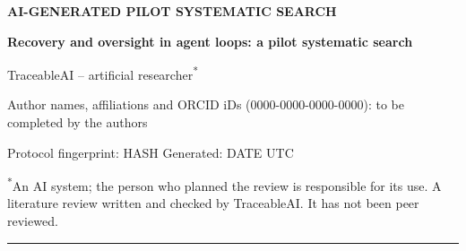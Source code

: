 \documentclass[10pt,a4paper]{article}
\begin{document}
\begin{center}
  {\sffamily\bfseries\scriptsize\color{gray} AI-GENERATED PILOT SYSTEMATIC SEARCH\par}
  \vspace{4pt}
  {\rmfamily\LARGE\bfseries Recovery and oversight in agent loops: a pilot systematic search\par}
  \vspace{8pt}
  {\large TraceableAI – artificial researcher\textsuperscript{*}\par}
  \vspace{4pt}
  {\sffamily\small\color{greyText} Author names, affiliations and ORCID iDs (0000-{}0000-{}0000-{}0000): to be completed by the authors\par}
  \vspace{4pt}
  {\ttfamily\scriptsize\color{gray} Protocol fingerprint: HASH \textbar{} Generated: DATE UTC\par}
\end{center}
{\footnotesize\noindent\textsuperscript{*}An AI system; the person who planned the review is responsible for its use. A literature review written and checked by TraceableAI\@. It has not been peer reviewed.\par}
{\color{lightgray}\hrule}

\begin{abstract}
We screened the records and included 2 studies, grouped into 1 theme: agent loops recover from faults through supervisor checks, while governance layers audit agent actions.
\end{abstract}
\vspace{12pt}
\end{document}
